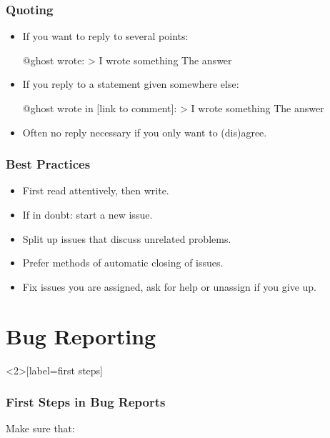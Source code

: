 \begin{frame}[fragile]
	\frametitle{Quoting}

	\begin{itemize}
	\item If you want to reply to several points:
		\begin{code}[gobble=8]
		@ghost wrote:
		> I wrote something
		The answer
		\end{code}
	\item If you reply to a statement given somewhere else:
		\begin{code}[gobble=8]
		@ghost wrote in [link to comment]:
		> I wrote something
		The answer
		\end{code}
	\item Often no reply necessary if you only want to (dis)agree.
	\end{itemize}
\end{frame}

\begin{frame}
	\frametitle{Best Practices}
	\begin{itemize}
		\item First read attentively, then write.
		\item If in doubt: start a new issue.
		\item Split up issues that discuss unrelated problems.
		\item Prefer methods of automatic closing of issues.
		\item Fix issues you are assigned, ask for help or unassign if you give up.
	\end{itemize}
\end{frame}

\section{Bug Reporting}


\begin{frame}<2>[label=first steps]
	\frametitle{First Steps in Bug Reports}
	Make sure that:

\end{frame}

